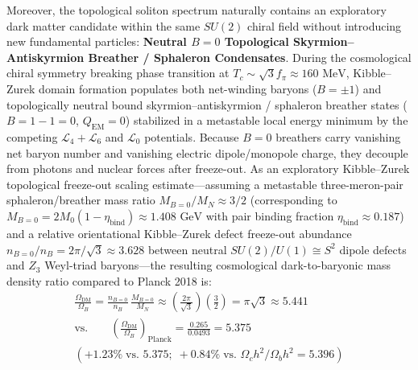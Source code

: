 \documentclass[10pt,aps,prd,twocolumn,superscriptaddress,nofootinbib,floatfix,longbibliography,showkeys]{revtex4-2}
\begin{document}
Moreover, the topological soliton spectrum naturally contains an exploratory dark matter candidate within the same $SU(2)$ chiral field without introducing new fundamental particles: \textbf{Neutral $B=0$ Topological Skyrmion--Antiskyrmion Breather / Sphaleron Condensates}. During the cosmological chiral symmetry breaking phase transition at $T_c \sim \sqrt{3}f_\pi \approx 160\text{ MeV}$, Kibble--Zurek domain formation populates both net-winding baryons ($B = \pm 1$) and topologically neutral bound skyrmion--antiskyrmion / sphaleron breather states ($B = 1 - 1 = 0$, $Q_{\text{EM}} = 0$) stabilized in a metastable local energy minimum by the competing $\mathcal{L}_4 + \mathcal{L}_6$ and $\mathcal{L}_0$ potentials. Because $B=0$ breathers carry vanishing net baryon number and vanishing electric dipole/monopole charge, they decouple from photons and nuclear forces after freeze-out. As an exploratory Kibble--Zurek topological freeze-out scaling estimate---assuming a metastable three-meron-pair sphaleron/breather mass ratio $M_{B=0}/M_N \approx 3/2$ (corresponding to $M_{B=0} = 2 M_0(1 - \eta_{\text{bind}}) \approx 1.408\text{ GeV}$ with pair binding fraction $\eta_{\text{bind}} \approx 0.187$) and a relative orientational Kibble--Zurek defect freeze-out abundance $n_{B=0}/n_B = 2\pi/\sqrt{3} \approx 3.628$ between neutral $SU(2)/U(1) \cong S^2$ dipole defects and $Z_3$ Weyl-triad baryons---the resulting cosmological dark-to-baryonic mass density ratio compared to Planck 2018 \cite{ref28,ref29} is:
\begin{equation}\begin{gathered}
\frac{\Omega_{\text{DM}}}{\Omega_B} = \frac{n_{B=0}}{n_B}\,\frac{M_{B=0}}{M_N} \approx \left(\frac{2\pi}{\sqrt{3}}\right)\left(\frac{3}{2}\right) = \pi\sqrt{3} \approx 5.441 \\
\text{vs.} \qquad \left(\frac{\Omega_{\text{DM}}}{\Omega_B}\right)_{\text{Planck}} = \frac{0.265}{0.0493} = 5.375 \\
(+1.23\%\;\text{vs. }5.375;\;+0.84\%\;\text{vs. }\Omega_c h^2/\Omega_b h^2 = 5.396)
\end{gathered}\end{equation}
\end{document}
